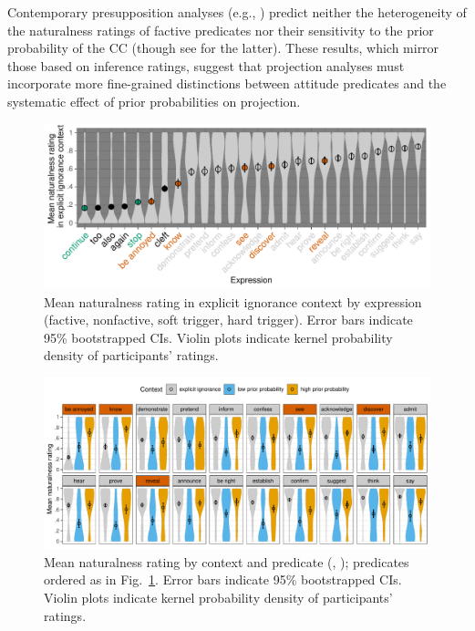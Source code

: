 \documentclass[12pt,fleqn]{article}
\newcommand{\6}{\mbox{$[\hspace*{-.6mm}[$}}
\newcommand{\9}{\mbox{$]\hspace*{-.6mm}]$}}
\begin{document}
Contemporary presupposition analyses (e.g., \citealt{heim83,vds92,abrusan2011,karttunen2016,simons-etal2017}) predict neither the heterogeneity of the naturalness ratings of factive predicates nor their sensitivity to the prior probability of the CC (though see \citealt{schlenker2021} for the latter). These results, which mirror those based on inference ratings, suggest that projection analyses must incorporate more fine-grained distinctions between attitude predicates and the systematic effect of prior probabilities on projection.

\newpage

\begin{figure}[h!]
\centering
\caption{\small{Mean naturalness rating in explicit ignorance context by expression (\color{orange}factive\color{black}, \color{gray}nonfactive\color{black}, \color{green} soft trigger\color{black}, \color{black}hard trigger\color{black}). Error bars indicate 95\% bootstrapped CIs. Violin plots indicate kernel probability density of participants' ratings.}}\label{fig:acc-by-expression}
\includegraphics[width=.9\textwidth]{../../results/main/13explicitIgnorance/graphs/explicit-ignorance-naturalness-by-predicate}
\end{figure}

\vspace*{-1cm}

\begin{figure}[h!]
\centering
\caption{\small{Mean naturalness rating by context and predicate (, ); predicates ordered as in Fig.~\ref{fig:acc-by-expression}. Error bars indicate 95\% bootstrapped CIs. Violin plots indicate kernel probability density of participants' ratings}.}\label{fig:acc-by-context}
\includegraphics[width=\textwidth]{../../results/main/13explicitIgnorance/graphs/ORDER-by-LANGUAGE-naturalness-by-context-and-predicate}
\end{figure}
\end{document}
